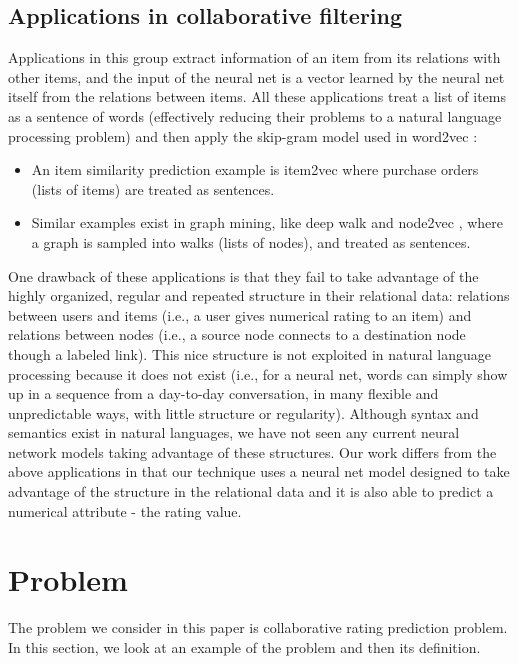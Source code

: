\documentclass[letterpaper]{article}
\begin{document}
\subsection{Applications in collaborative filtering}
Applications in this group extract information of an item from its relations 
with other items, and the input of the neural net is a vector learned by the 
neural net itself from the relations between items.
All these applications treat a list of items as a sentence of words 
(effectively reducing their problems to a natural language processing problem)  
and then apply the skip-gram model used in word2vec 
\citeauthor{mikolov2013efficient}:
\begin{itemize}
	\item An item similarity prediction example is item2vec 
	\citeauthor{barkan2016item2vec} where purchase orders (lists of items) are 
	treated as sentences.
	\item Similar examples exist in graph mining, like deep walk 
	\citeauthor{perozzi2014deepwalk} and node2vec \citeauthor{grovernode2vec}, 
	where a 
	graph is sampled into walks (lists of nodes), and treated as sentences.
\end{itemize}
One drawback of these applications is that they fail to take advantage of 
the highly organized, regular and repeated structure in their relational data: 
relations between users and items (i.e., a user gives numerical rating to an 
item) and relations between nodes (i.e., a source node connects to a 
destination node though a labeled link).
This nice structure is not exploited in natural language processing because it 
does not exist (i.e., for a neural net, words can simply show up in a sequence 
from a day-to-day conversation, in many flexible and unpredictable ways, with 
little structure or regularity).
Although syntax and semantics exist in natural languages, we have not seen any 
current neural network models taking advantage of these structures.
Our work differs from the above applications in that our technique uses a 
neural net model designed to take advantage of the structure in the relational 
data and it is also able to predict a numerical attribute - the rating value.

\section{Problem}
The problem we consider in this paper is collaborative rating prediction 
problem.
In this section, we look at an example of the problem and then its definition.
\end{document}
